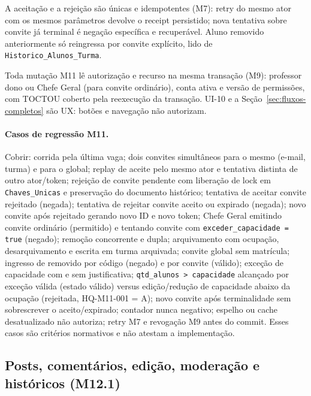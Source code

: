\begin{regra}
A aceitação e a rejeição são únicas e idempotentes (M7): retry do mesmo ator com os mesmos parâmetros devolve o receipt persistido; nova tentativa sobre convite já terminal é negação específica e recuperável. Aluno removido anteriormente só reingressa por convite explícito, lido de \texttt{Historico\_Alunos\_Turma}.

Toda mutação M11 lê autorização e recurso na mesma transação (M9): professor dono ou Chefe Geral (para convite ordinário), conta ativa e versão de permissões, com TOCTOU coberto pela reexecução da transação. UI-10 e a Seção~\ref{sec:fluxos-completos} são UX: botões e navegação não autorizam.
\end{regra}

\paragraph{Casos de regressão M11.}
Cobrir: corrida pela última vaga; dois convites simultâneos para o mesmo
(e-mail, turma) e para o global; replay de aceite pelo mesmo ator e tentativa
distinta de outro ator/token; rejeição de convite pendente com liberação de lock em \texttt{Chaves\_Unicas} e preservação do documento histórico; tentativa de aceitar convite rejeitado (negada); tentativa de rejeitar convite aceito ou expirado (negada); novo convite após rejeitado gerando novo ID e novo token; Chefe Geral emitindo convite ordinário (permitido) e tentando convite com \texttt{exceder\_capacidade = true} (negado); remoção concorrente e dupla; arquivamento com
ocupação, desarquivamento e escrita em turma arquivada; convite global sem
matrícula; ingresso de removido por código (negado) e por convite (válido);
exceção de capacidade com e sem justificativa; \texttt{qtd\_alunos > capacidade}
alcançado por exceção válida (estado válido) versus edição/redução de capacidade
abaixo da ocupação (rejeitada, HQ-M11-001 = A); novo convite após terminalidade
sem sobrescrever o aceito/expirado; contador nunca negativo; espelho ou cache
desatualizado não autoriza; retry M7 e revogação M9 antes do commit. Esses
casos são critérios normativos e não atestam a implementação.

\subsection{Posts, comentários, edição, moderação e históricos (M12.1)}
\label{sec:regras-posts-comentarios-m12-1}

